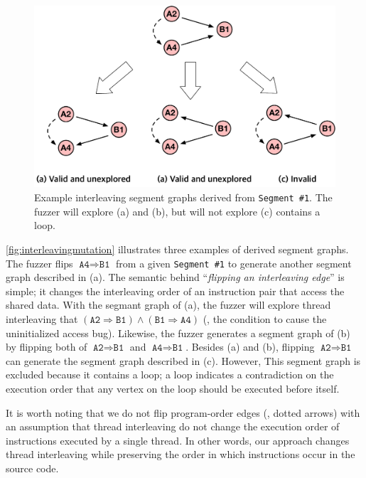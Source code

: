 \begin{figure}[t]
  \centering
  \includegraphics[width=0.9\linewidth]{fig/interleavingmutation.pdf}
  \caption{Example interleaving segment graphs derived from
    \texttt{Segment \#1}. The fuzzer will explore (a) and (b), but
    will not explore (c) contains a loop.}
  \label{fig:interleavingmutation}
\end{figure}
%

\autoref{fig:interleavingmutation} illustrates three examples of
derived segment graphs.
%
The fuzzer flips $\texttt{A4} \Rightarrow \texttt{B1}$ from a given
\texttt{Segment \#1} to generate another segment graph described in
(a).
%
The semantic behind ``\textit{flipping an interleaving edge}'' is
simple; it changes the interleaving order of an instruction pair that
access the shared data.
%
With the segmant graph of (a), the fuzzer will explore thread
interleaving that
$(\texttt{A2} \Rightarrow \texttt{B1}) \wedge (\texttt{B1} \Rightarrow
\texttt{A4})$ (\ie, the condition to cause the uninitialized access
bug).
%
Likewise, the fuzzer generates a segment graph of (b) by flipping both
of $\texttt{A2} \Rightarrow \texttt{B1}$ and
$\texttt{A4} \Rightarrow \texttt{B1}$.
%
Besides (a) and (b), flipping $\texttt{A2} \Rightarrow \texttt{B1}$
can generate the segment graph described in (c). However, This segment
graph is excluded because it contains a loop; a loop indicates a
contradiction on the execution order that any vertex on the loop
should be executed before itself.


It is worth noting that we do not flip program-order edges (\ie,
dotted arrows) with an assumption that thread interleaving do not
change the execution order of instructions executed by a single
thread.
%
In other words, our approach changes thread interleaving while
preserving the order in which instructions occur in the source code.



